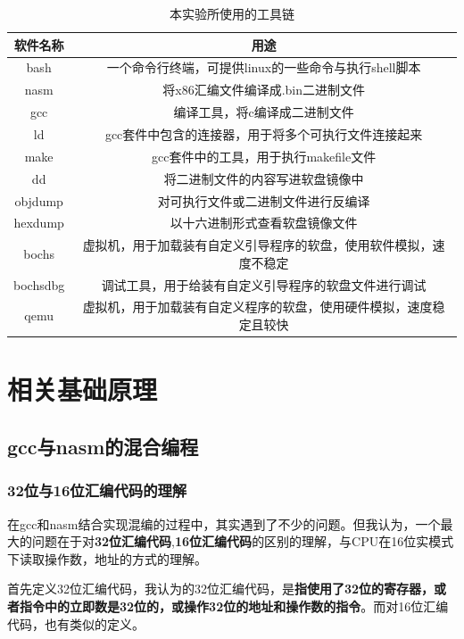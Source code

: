 \documentclass[forprint]{WHUBachelor}
\begin{document}
\begin{table}[htp]
  \caption{本实验所使用的工具链}
  \centering
  \begin{tabular}{cc}
    \toprule
    软件名称 & 用途  \\
    \midrule
    bash & 一个命令行终端，可提供linux的一些命令与执行shell脚本 \\
    nasm & 将x86汇编文件编译成.bin二进制文件 \\
    gcc & 编译工具，将c编译成二进制文件 \\
    ld & gcc套件中包含的连接器，用于将多个可执行文件连接起来 \\
    make & gcc套件中的工具，用于执行makefile文件 \\
    dd & 将二进制文件的内容写进软盘镜像中  \\
    objdump & 对可执行文件或二进制文件进行反编译 \\
    hexdump & 以十六进制形式查看软盘镜像文件 \\
    bochs & 虚拟机，用于加载装有自定义引导程序的软盘，使用软件模拟，速度不稳定  \\
    bochsdbg & 调试工具，用于给装有自定义引导程序的软盘文件进行调试 \\
    qemu & 虚拟机，用于加载装有自定义程序的软盘，使用硬件模拟，速度稳定且较快 \\
    \bottomrule
  \end{tabular}
  \label{tab:tools}
\end{table}

\section{相关基础原理}

\subsection{gcc与nasm的混合编程}

\subsubsection{32位与16位汇编代码的理解}

在gcc和nasm结合实现混编的过程中，其实遇到了不少的问题。但我认为，一个最大的问题在于对\textbf{32位汇编代码},\textbf{16位汇编代码}的区别的理解，与CPU在16位实模式下读取操作数，地址的方式的理解。

首先定义32位汇编代码，我认为的32位汇编代码，是\textbf{指使用了32位的寄存器，或者指令中的立即数是32位的，或操作32位的地址和操作数的指令}。而对16位汇编代码，也有类似的定义。
\end{document}
